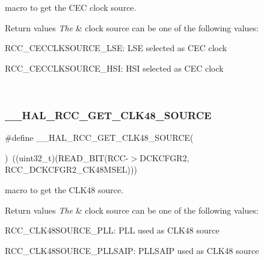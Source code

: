 macro to get the C\+EC clock source. 


\begin{DoxyRetVals}{Return values}
{\em The} & clock source can be one of the following values\+: \begin{DoxyItemize}
\item R\+C\+C\+\_\+\+C\+E\+C\+C\+L\+K\+S\+O\+U\+R\+C\+E\+\_\+\+L\+SE\+: L\+SE selected as C\+EC clock \item R\+C\+C\+\_\+\+C\+E\+C\+C\+L\+K\+S\+O\+U\+R\+C\+E\+\_\+\+H\+SI\+: H\+SI selected as C\+EC clock \end{DoxyItemize}
\\
\hline
\end{DoxyRetVals}
\mbox{\label{group___r_c_c_ex___exported___macros_ga9b3a77cb4bb659160407d3dcf96b6915}} 
\subsubsection{\texorpdfstring{\_\_HAL\_RCC\_GET\_CLK48\_SOURCE}{\_\_HAL\_RCC\_GET\_CLK48\_SOURCE}}
{\footnotesize\ttfamily \#define \+\_\+\+\_\+\+H\+A\+L\+\_\+\+R\+C\+C\+\_\+\+G\+E\+T\+\_\+\+C\+L\+K48\+\_\+\+S\+O\+U\+R\+CE(\begin{DoxyParamCaption}{ }\end{DoxyParamCaption})~((uint32\+\_\+t)(R\+E\+A\+D\+\_\+\+B\+IT(R\+CC-\/$>$D\+C\+K\+C\+F\+G\+R2, R\+C\+C\+\_\+\+D\+C\+K\+C\+F\+G\+R2\+\_\+\+C\+K48\+M\+S\+EL)))}



macro to get the C\+L\+K48 source. 


\begin{DoxyRetVals}{Return values}
{\em The} & clock source can be one of the following values\+: \begin{DoxyItemize}
\item R\+C\+C\+\_\+\+C\+L\+K48\+S\+O\+U\+R\+C\+E\+\_\+\+P\+LL\+: P\+LL used as C\+L\+K48 source \item R\+C\+C\+\_\+\+C\+L\+K48\+S\+O\+U\+R\+C\+E\+\_\+\+P\+L\+L\+S\+A\+IP\+: P\+L\+L\+S\+A\+IP used as C\+L\+K48 source \end{DoxyItemize}
\\
\hline
\end{DoxyRetVals}
\mbox{\label{group___r_c_c_ex___exported___macros_gab9372aa811e622a602d2b3657790c8e7}} 
